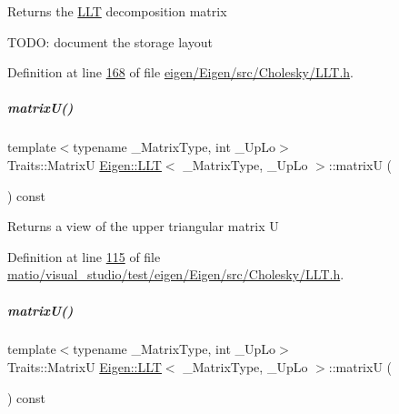 \begin{DoxyReturn}{Returns}
the \hyperlink{group___cholesky___module_class_eigen_1_1_l_l_t}{L\+LT} decomposition matrix
\end{DoxyReturn}
T\+O\+DO\+: document the storage layout 

Definition at line \hyperlink{eigen_2_eigen_2src_2_cholesky_2_l_l_t_8h_source_l00168}{168} of file \hyperlink{eigen_2_eigen_2src_2_cholesky_2_l_l_t_8h_source}{eigen/\+Eigen/src/\+Cholesky/\+L\+L\+T.\+h}.

\mbox{\label{group___cholesky___module_a18a390f085567e650e8345cc7e7c0df8}} 
\subparagraph{\texorpdfstring{matrix\+U()}{matrixU()}\hspace{0.1cm}{\footnotesize\ttfamily [1/2]}}
{\footnotesize\ttfamily template$<$typename \+\_\+\+Matrix\+Type, int \+\_\+\+Up\+Lo$>$ \\
Traits\+::\+MatrixU \hyperlink{group___cholesky___module_class_eigen_1_1_l_l_t}{Eigen\+::\+L\+LT}$<$ \+\_\+\+Matrix\+Type, \+\_\+\+Up\+Lo $>$\+::matrixU (\begin{DoxyParamCaption}{ }\end{DoxyParamCaption}) const\hspace{0.3cm}{\ttfamily [inline]}}

\begin{DoxyReturn}{Returns}
a view of the upper triangular matrix U 
\end{DoxyReturn}


Definition at line \hyperlink{matio_2visual__studio_2test_2eigen_2_eigen_2src_2_cholesky_2_l_l_t_8h_source_l00115}{115} of file \hyperlink{matio_2visual__studio_2test_2eigen_2_eigen_2src_2_cholesky_2_l_l_t_8h_source}{matio/visual\+\_\+studio/test/eigen/\+Eigen/src/\+Cholesky/\+L\+L\+T.\+h}.

\mbox{\label{group___cholesky___module_a18a390f085567e650e8345cc7e7c0df8}} 
\subparagraph{\texorpdfstring{matrix\+U()}{matrixU()}\hspace{0.1cm}{\footnotesize\ttfamily [2/2]}}
{\footnotesize\ttfamily template$<$typename \+\_\+\+Matrix\+Type, int \+\_\+\+Up\+Lo$>$ \\
Traits\+::\+MatrixU \hyperlink{group___cholesky___module_class_eigen_1_1_l_l_t}{Eigen\+::\+L\+LT}$<$ \+\_\+\+Matrix\+Type, \+\_\+\+Up\+Lo $>$\+::matrixU (\begin{DoxyParamCaption}{ }\end{DoxyParamCaption}) const\hspace{0.3cm}{\ttfamily [inline]}}


